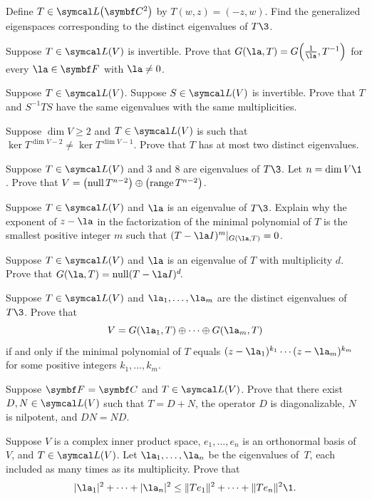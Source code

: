 \begin{exercises}

\exercise
Define $T \in \L\paren[\big]{\C{2}}$ by
$
T(w,z) = (-z, w)$.
Find the generalized eigenspaces corresponding to the distinct eigenvalues of $T\3$.


\exercise
Suppose $T \in \L(V)$ is invertible. Prove that $G(\la, T) = G\paren[\Big]{\frac{1}{\la}, T^{-1}}$ for every $\la \in \F{}$ with $\la \ne 0$.


\exercise
Suppose $T \in \L(V)$.  Suppose $S \in \L(V)$ is invertible. Prove that $T$ and $S^{-1} T S$ have the same eigenvalues with the same multiplicities.


\exercise
Suppose $\dim V \ge 2$ and $T \in \L(V)$ is such that $\ker T^{\dim V-2\!}  \ne \ker T^{\dim V-1\!}$.
Prove that $T$ has at most two distinct eigenvalues.


\exercise
Suppose $T \in \L(V)$ and $3$ and $8$ are eigenvalues of $T\3$. Let $n = \dim V\1$. Prove that
$V = \paren[\big]{\ker T^{n-2}} \oplus \paren[\big]{\ran T^{n-2}}$.


\exercise
Suppose $T \in \L(V)$ and $\la$ is an eigenvalue of $T\3$. Explain why the exponent of $z-\la$ in the factorization of the minimal polynomial of $T$ is the smallest positive integer $m$ such that $(T - \la I)^m|_{G(\la, T)} = 0$.


\exercise
Suppose $T \in \L(V)$ and $\la$ is an eigenvalue of $T$ with multiplicity $d$. Prove that
$
G(\la, T) = \ker(T - \la I)^d\!$.


\exercise
Suppose $T \in \L(V)$ and $\la_1, \ldots, \la_m$ are the distinct eigenvalues of $T\3$. Prove that\label{8Rdecomp}
\[
V = G(\la_1, T) \oplus \cdots \oplus G(\la_m, T)
\]
if and only if the minimal polynomial of $T$ equals
$(z-\la_1)^{k_1} \cdots (z - \la_m)^{k_m}$ for some positive integers $k_1, \ldots, k_m$.


\exercise
Suppose $\F{} = \C{}$ and $T \in \L(V)$. Prove that there exist $D, N \in \L(V)$ such that $T = D + N$, the operator $D$ is diagonalizable, $N$ is nilpotent, and $DN = ND$.


\exercise
Suppose $V$ is a complex inner product space, $e_1, \ldots, e_n$ is an orthonormal basis of $V$, and $T \in \L(V)$.  Let
$\la_1, \dots, \la_n$ be the eigenvalues of~$T$, each included as many times as its multiplicity. Prove that
\[
|\la_1|^2 + \dots + |\la_n|^2 \le \norm{Te_1}^2 + \cdots + \norm{Te_n}^2\1.
\]



\end{exercises}
